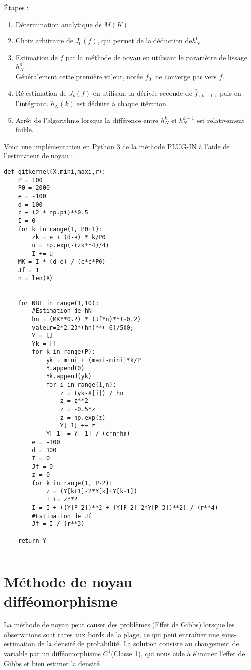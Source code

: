 Étapes : 
\begin{enumerate}
    \item 	Détermination analytique de $M(K) $
	\item Choix arbitraire de $J_0(f)$, qui permet de la déduction de$h_N^0$
	\item Estimation de $f$ par la méthode de noyau en utilisant le paramètre de lissage $h_N^0$.\\Généralement cette première valeur, notée $f_0$, ne converge pas vers $f$.
	\item Ré-estimation de $J_k(f)$ en utilisant la dérivée seconde de ${\hat f}_{(k-1)}$ puis en l’intégrant. $h_N(k)$ est déduite à chaque itération.
	\item Arrêt de l’algorithme lorsque la différence entre $h_N^k$ et $h_N^{k-1}$ est relativement faible.

\end{enumerate}
Voici une implémentation en Python 3 de la méthode PLUG-IN à l’aide de l’estimateur de noyau : 
\begin{lstlisting}
def gitkernel(X,mini,maxi,r):
    P = 100
    P0 = 2000
    e = -100
    d = 100
    c = (2 * np.pi)**0.5
    I = 0
    for k in range(1, P0+1):
        zk = e + (d-e) * k/P0
        u = np.exp(-(zk**4)/4)
        I += u
    MK = I * (d-e) / (c*c*P0)
    Jf = 1
    n = len(X)


    for NBI in range(1,10):
        #Estimation de hN
        hn = (MK**0.2) * (Jf*n)**(-0.2)
        valeur=2*2.23*(hn)**(-6)/500;
        Y = []
        Yk = []
        for k in range(P):
            yk = mini + (maxi-mini)*k/P
            Y.append(0)
            Yk.append(yk)
            for i in range(1,n):
                z = (yk-X[i]) / hn
                z = z**2
                z = -0.5*z
                z = np.exp(z)
                Y[-1] += z
            Y[-1] = Y[-1] / (c*n*hn)
        e = -100
        d = 100
        I = 0
        Jf = 0
        z = 0
        for k in range(1, P-2):
            z = (Y[k+1]-2*Y[k]+Y[k-1])
            I += z**2
        I = I + ((Y[P-2])**2 + (Y[P-2]-2*Y[P-3])**2) / (r**4)
        #Estimation de Jf 
        Jf = I / (r**3)
        
    return Y


\end{lstlisting}

\section{Méthode de noyau difféomorphisme}
La méthode de noyau peut causer des problèmes (Effet de Gibbs) lorsque les observations sont rares aux bords de la plage, ce qui peut entraîner une sous-estimation de la densité de probabilité.
La solution consiste au changement de variable par un difféomorphisme $C^1$(Classe 1), qui nous aide à éliminer l’effet de Gibbs et bien estimer la densité.

